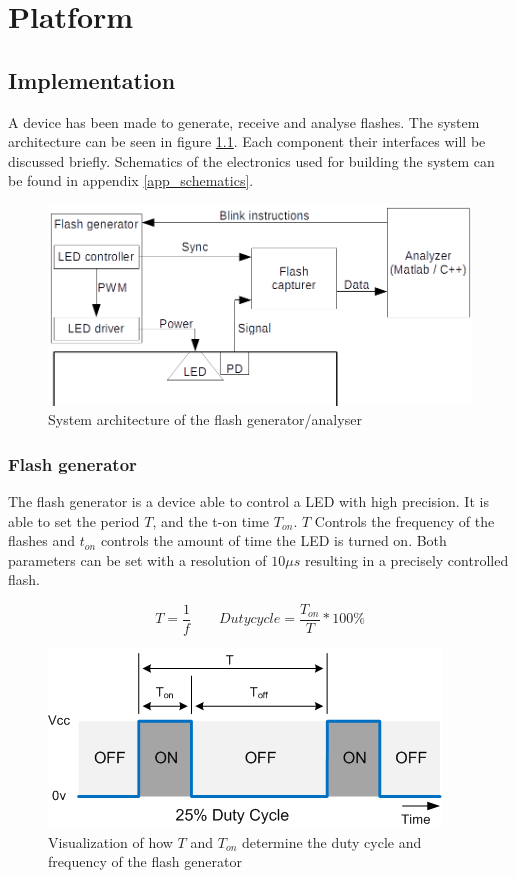 \chapter{Platform}
\label{chp:Platform}

\section{Implementation}
\label{sec:Implementation}
A device has been made to generate, receive and analyse flashes. The system architecture can be seen in figure \ref{fig:systemOveriew}. Each component their interfaces will be discussed briefly. Schematics of the electronics used for building the system can be found in appendix \ref{app_schematics}.

\begin{figure}[!h]
	\includegraphics[width=\textwidth]{pics/systemOverview.png}
	\caption{System architecture of the flash generator/analyser}
	\label{fig:systemOveriew}
\end{figure}

\subsection{Flash generator}
The flash generator is a device able to control a LED with high precision. It is able to set the period $T$, and the t-on time $T_{on}$. $T$ Controls the frequency of the flashes and $t_{on}$ controls the amount of time the LED is turned on. Both parameters can be set with a resolution of $10\mu s$ resulting in a precisely controlled flash.

\begin{equation}
\label{eq:1/f=T}
T=\frac{1}{f}
\qquad
Duty cycle=\frac{T_{on}}{T} * 100\%
\end{equation}

\begin{figure}[!h]
	\centering
	\includegraphics[]{pics/DutyCycle.png}
	\caption{Visualization of how $T$ and $T_{on}$ determine the duty cycle and frequency of the flash generator}
	\label{fig:DutyCycle}
\end{figure}

